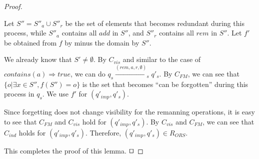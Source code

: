 \begin {proof}
\begin{itemize}
    Let $S'' = S''_a \cup S''_r$ be the set of elements that becomes redundant during this process, while $S''_a$ contains all $\mathit{add}$ in $S''$, and $S''_r$ contains all $\mathit{rem}$ in $S''$. Let $f'$ be obtained from $f$ by minus the domain by $S''$.

    We already know that $S' \neq \emptyset$. By $C_{\mathit{vis}}$ and similar to the case of $\mathit{contains}(a) \Rightarrow \mathit{true}$, we can do $q_s \xrightarrow{( \mathit{rem},a,r,\emptyset )}_s q'_s$. By $C_{\mathit{FM}}$, we can see that $\{ o \vert \exists x \in S'', f(S'') = o \}$ is the set that becomes ``can be forgotten'' during this process in $q_s$. We use $f'$ for $(q'_{\mathit{imp}},q'_s)$.

    Since forgetting does not change visibility for the remanning operations, it is easy to see that $C_{\mathit{FM}}$ and $C_{\mathit{vis}}$ hold for $(q'_{\mathit{imp}},q'_s)$. By $C_{\mathit{vis}}$ and $C_{\mathit{FM}}$, we can see that $C_{\mathit{ind}}$ holds for $(q'_{\mathit{imp}},q'_s)$. Therefore, $(q'_{\mathit{imp}},q'_s) \in R_{\mathit{ORS}}$.
\end{itemize}

This completes the proof of this lemma. $\qed$
\end {proof}

































